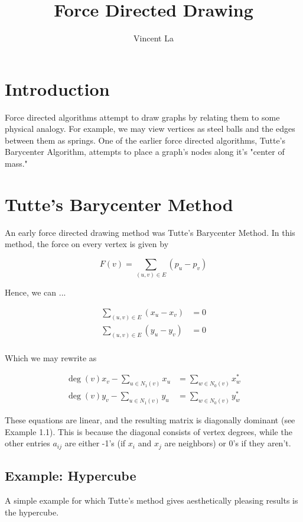 \documentclass[11pt]{article}
\title{Force Directed Drawing}
\author{Vincent La}
\begin{document}
\maketitle

\section{Introduction}
Force directed algorithms attempt to draw graphs by relating them to some physical analogy. For example, we may view vertices as steel balls and the edges between them as springs. One of the earlier force directed algorithms, Tutte's Barycenter Algorithm, attempts to place a graph's nodes along it's "center of mass."

\section{Tutte's Barycenter Method}
An early force directed drawing method was Tutte's Barycenter Method. In this method, the force on every vertex is given by 

\[ F(v) = \sum_{(u, v) \in E} (p_u - p_v) \]

Hence, we can ...

\[
\begin{aligned}
    \sum_{(u, v) \in E} (x_u - x_v) &= 0 \\
    \sum_{(u, v) \in E} (y_u - y_v) &= 0 \\
\end{aligned}
\]

Which we may rewrite as

\[
\begin{aligned}
    \deg{(v)}x_v - \sum_{u \in N_1(v)} x_u &= \sum_{w \in N_0(v)} x^*_w \\
    \deg{(v)}y_v - \sum_{u \in N_1(v)} y_u &= \sum_{w \in N_0(v)} y^*_w
\end{aligned}
\]

These equations are linear, and the resulting matrix is diagonally dominant (see Example 1.1). This is because the diagonal consists of vertex degrees, while the other entries $a_{ij}$ are either -1's (if $x_i$ and $x_j$ are neighbors) or 0's if they aren't.

\subsection{Example: Hypercube}
A simple example for which Tutte's method gives aesthetically pleasing results is the hypercube.
\end{document}

